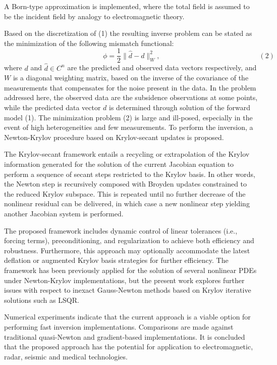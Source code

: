 \documentclass[twosided]{report}
\begin{document}
A Born-type approximation is implemented, where the
total field is assumed to be the incident field by
analogy to electromagnetic theory.

Based on the discretization of
(1) the resulting inverse problem can be stated as
the minimization of the following mismatch functional:
$$
\qquad
\qquad
\qquad
\qquad
\qquad
\qquad
\qquad
\phi =\frac{1}{2} \|\hat{d}-d\|_W^2,
\qquad
\qquad
\qquad
\qquad
\qquad
\qquad
\qquad
(2)
$$
where $d$ and $\hat{d}\in C^n$
are the predicted and observed data vectors
respectively, and $W$ is a diagonal weighting matrix, based
on the inverse of the covariance of the measurements that
compensates for the noise present in the data. In the
problem addressed here, the observed data are the subsidence
observations at some points, while the predicted data vector
$d$ is determined through solution of the forward model
(1).
The minimization problem (2) is large
and ill-posed, especially in the event of high
heterogeneities and few measurements. To perform the
inversion, a Newton-Krylov procedure based on
Krylov-secant updates is proposed.

The Krylov-secant framework entails
a recycling or extrapolation of the Krylov information
generated for the solution of the current Jacobian equation
to perform a sequence of secant steps restricted to the
Krylov basis. In other words, the Newton step is recursively
composed with Broyden updates constrained to the reduced
Krylov subspace. This is repeated until no further decrease
of the nonlinear residual can be delivered, in which case a
new nonlinear step yielding another Jacobian system is
performed.

The proposed framework includes dynamic
control of linear tolerances (i.e., forcing terms),
preconditioning, and regularization to achieve both
efficiency and robustness. Furthermore, this approach may
optionally accommodate the latest deflation or augmented
Krylov basis strategies for further efficiency. The
framework has been previously applied for the solution of
several nonlinear PDEs under Newton-Krylov implementations,
but the present work explores further issues with respect to
inexact Gauss-Newton methods based on Krylov iterative
solutions such as LSQR.

Numerical experiments indicate
that the current approach is a viable option for performing
fast inversion implementations. Comparisons are made against
traditional quasi-Newton and gradient-based implementations.
It is concluded that the proposed approach has the potential
for application to electromagnetic, radar, seismic and
medical technologies.
\end{document}
